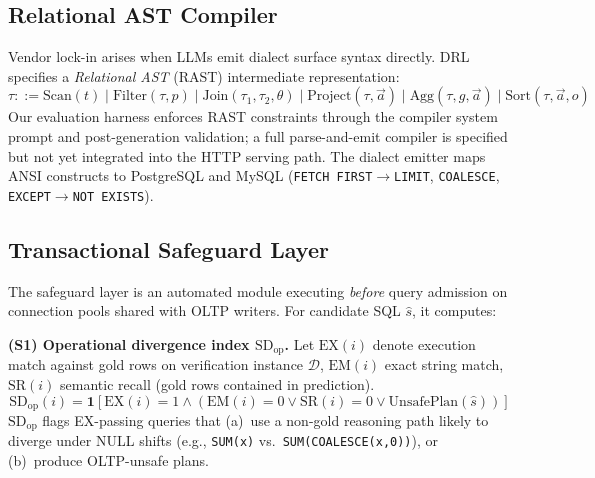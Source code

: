 \documentclass[twocolumn]{svjour3}
\begin{document}
\subsection{Relational AST Compiler}
\label{sec:rast}

Vendor lock-in arises when LLMs emit dialect surface syntax directly.
DRL specifies a \emph{Relational AST} (RAST) intermediate representation:
\[
  \tau ::= \text{Scan}(t)\mid \text{Filter}(\tau,p)\mid \text{Join}(\tau_1,\tau_2,\theta)\mid \text{Project}(\tau,\vec{a})\mid \text{Agg}(\tau,g,\vec{a})\mid \text{Sort}(\tau,\vec{a},o)
\]
Our evaluation harness enforces RAST constraints through the compiler system prompt and post-generation validation; a full parse-and-emit compiler is specified but not yet integrated into the HTTP serving path.
The dialect emitter maps ANSI constructs to PostgreSQL and MySQL (\texttt{FETCH FIRST}$\rightarrow$\texttt{LIMIT}, \texttt{COALESCE}, \texttt{EXCEPT}$\rightarrow$\texttt{NOT EXISTS}).

\subsection{Transactional Safeguard Layer}
\label{sec:safeguard}

The safeguard layer is an automated module executing \emph{before} query admission on connection pools shared with OLTP writers.
For candidate SQL $\hat{s}$, it computes:

\textbf{(S1) Operational divergence index $\text{SD}_{\text{op}}$.}
Let $\text{EX}(i)$ denote execution match against gold rows on verification instance $\mathcal{D}$, $\text{EM}(i)$ exact string match, $\text{SR}(i)$ semantic recall (gold rows contained in prediction).
\begin{equation}
  \text{SD}_{\text{op}}(i) = \mathbf{1}[\text{EX}(i){=}1 \land (\text{EM}(i){=}0 \lor \text{SR}(i){=}0 \lor \text{UnsafePlan}(\hat{s}))]
\end{equation}
$\text{SD}_{\text{op}}$ flags EX-passing queries that (a)~use a non-gold reasoning path likely to diverge under NULL shifts (e.g., \texttt{SUM(x)} vs.\ \texttt{SUM(COALESCE(x,0))}), or (b)~produce OLTP-unsafe plans.
\end{document}
